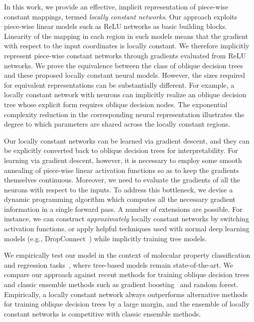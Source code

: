 \documentclass{article} \usepackage{iclr2020_conference,times}
\begin{document}
In this work, we provide an effective, implicit representation of piece-wise constant mappings, termed \emph{locally constant networks}. Our approach exploits piece-wise linear models such as ReLU networks as basic building blocks. Linearity of the mapping in each region in such models means that the gradient with respect to the input coordinates is locally constant. We therefore implicitly represent piece-wise constant networks through gradients evaluated from ReLU networks. We prove the equivalence between the class of oblique decision trees and these proposed locally constant neural models. However, the sizes required for equivalent representations can be substantially different. For example, a locally constant network with  neurons can implicitly realize an oblique decision tree whose explicit form requires  oblique decision nodes. The exponential complexity reduction in the corresponding neural representation illustrates the degree to which parameters are shared across the locally constant regions.
 
Our locally constant networks can be learned via gradient descent, and they can be explicitly converted back to oblique decision trees for interpretability. For learning via gradient descent, however, it is necessary to employ some smooth annealing of piece-wise linear activation functions so as to keep the gradients themselves continuous. Moreover, we need to evaluate the gradients of all the neurons with respect to the inputs. To address this bottleneck, we devise a dynamic programming algorithm which computes all the necessary gradient information in a single forward pass. A number of extensions are possible. For instance, we can construct \emph{approximately} locally constant networks by switching activation functions, or apply helpful techniques used with normal deep learning models (e.g., DropConnect~\citep{wan2013regularization}) while implicitly training tree models. 


We empirically test our model in the context of molecular property classification and regression tasks~\citep{wu2018moleculenet}, where tree-based models remain state-of-the-art. We compare our approach against recent methods for training oblique decision trees and classic ensemble methods such as gradient boosting~\citep{friedman2001greedy} and random forest. Empirically, a locally constant network always outperforms alternative methods for training oblique decision trees by a large margin, and the ensemble of locally constant networks is competitive with classic ensemble methods. 
\end{document}
